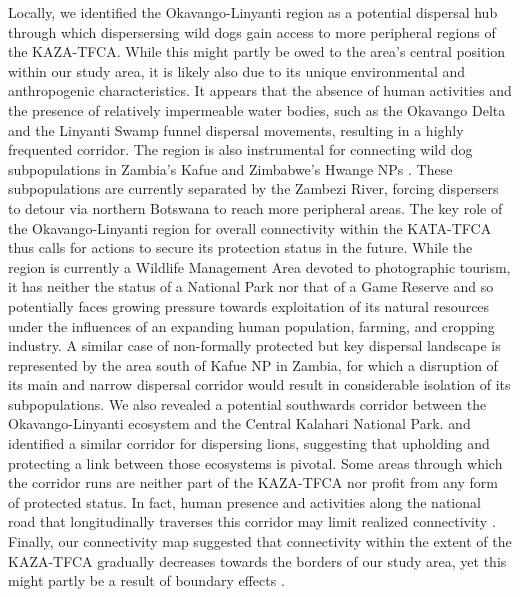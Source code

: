 \documentclass[abstract=on,10pt,a4paper,bibliography=totocnumbered]{article}
\begin{document}
Locally, we identified the Okavango-Linyanti region as a potential dispersal hub
through which dispersersing wild dogs gain access to more peripheral regions of
the KAZA-TFCA. While this might partly be owed to the area's central position
within our study area, it is likely also due to its unique environmental and
anthropogenic characteristics. It appears that the absence of human activities
and the presence of relatively impermeable water bodies, such as the Okavango
Delta and the Linyanti Swamp funnel dispersal movements, resulting in a highly
frequented corridor. The region is also instrumental for connecting wild dog
subpopulations in Zambia's Kafue and Zimbabwe's Hwange NPs
\citep{Woodroffe.2012}. These subpopulations are currently separated by the
Zambezi River, forcing dispersers to detour via northern Botswana to reach more
peripheral areas. The key role of the Okavango-Linyanti region for overall
connectivity within the KATA-TFCA thus calls for actions to secure its
protection status in the future. While the region is currently a Wildlife
Management Area devoted to photographic tourism, it has neither the status of a
National Park nor that of a Game Reserve and so potentially faces growing
pressure towards exploitation of its natural resources under the influences of
an expanding human population, farming, and cropping industry. A similar case of
non-formally protected but key dispersal landscape is represented by the area
south of Kafue NP in Zambia, for which a disruption of its main and narrow
dispersal corridor would result in considerable isolation of its subpopulations.
We also revealed a potential southwards corridor between the Okavango-Linyanti
ecosystem and the Central Kalahari National Park. \cite{Elliot.2014} and
\citep{Cushman.2018} identified a similar corridor for dispersing lions,
suggesting that upholding and protecting a link between those ecosystems is
pivotal. Some areas through which the corridor runs are neither part of the
KAZA-TFCA nor profit from any form of protected status. In fact, human presence
and activities along the national road that longitudinally traverses this
corridor may limit realized connectivity \citep{Cozzi.2020}. Finally, our
connectivity map suggested that connectivity within the extent of the KAZA-TFCA
gradually decreases towards the borders of our study area, yet this might partly
be a result of boundary effects \citep{Koen.2010}.
\end{document}
